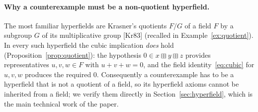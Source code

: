 \documentclass[11pt]{article}
\theoremstyle{plain}
\theoremstyle{definition}
\newcommand{\bp}{\boxplus}
\begin{document}
\paragraph{Why a counterexample must be a non-quotient hyperfield.}
The most familiar hyperfields are Krasner's quotients $F/G$ of a field
$F$ by a subgroup $G$ of its multiplicative group
[Kr83] (recalled in Example~\ref{ex:quotient}).  In every such hyperfield the cubic
implication \emph{does} hold (Proposition~\ref{prop:quotient}): the
hypothesis $0\in x\bp y\bp z$ provides representatives $u,v,w\in F$
with $u+v+w=0$, and the field identity~\eqref{eq:cubic} for $u,v,w$
produces the required $0$.  Consequently a counterexample has to be a
hyperfield that is not a quotient of a field, so its hyperfield axioms
cannot be inherited from a field; we verify them directly in
Section~\ref{sec:hyperfield}, which is the main technical work of the
paper.
\end{document}
